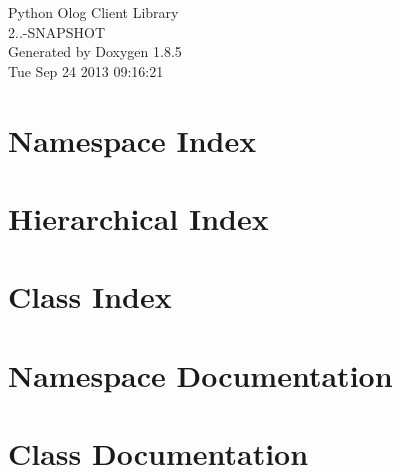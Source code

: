 \documentclass[twoside]{book}
\newcommand{\clearemptydoublepage}{%
  \newpage{\pagestyle{empty}\cleardoublepage}%
}
\begin{document}
\hypersetup{pageanchor=false}
\begin{titlepage}
\vspace*{7cm}
\begin{center}%
{\Large Python Olog Client Library \\[1ex]\large 2..-\/\-S\-N\-A\-P\-S\-H\-O\-T }\\
\vspace*{1cm}
{\large Generated by Doxygen 1.8.5}\\
\vspace*{0.5cm}
{\small Tue Sep 24 2013 09:16:21}\\
\end{center}
\end{titlepage}
\clearemptydoublepage
\tableofcontents
\clearemptydoublepage
{}
\hypersetup{pageanchor=true}

\chapter{Namespace Index}

\chapter{Hierarchical Index}

\chapter{Class Index}

\chapter{Namespace Documentation}


\chapter{Class Documentation}















\newpage
{}
{}
\printindex
\end{document}
